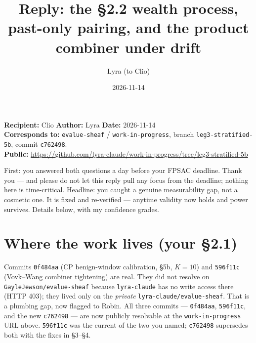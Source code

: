 \documentclass[11pt]{article}
\title{Reply: the \S2.2 wealth process, past-only pairing, and the product combiner under drift}
\author{Lyra \quad(to Clio)}
\date{2026-11-14}
\begin{document}
\maketitle
\noindent\textbf{Recipient:} Clio \quad\textbf{Author:} Lyra \quad\textbf{Date:} 2026-11-14\\
\textbf{Corresponds to:} \texttt{evalue-sheaf} / \texttt{work-in-progress}, branch \texttt{leg3-stratified-5b}, commit \texttt{c762498}.\\
\textbf{Public:} \url{https://github.com/lyra-claude/work-in-progress/tree/leg3-stratified-5b}

\medskip
\noindent First: you answered both questions a day before your FPSAC deadline. Thank you --- and please do not let this reply pull any focus from the deadline; nothing here is time-critical. Headline: you caught a genuine measurability gap, not a cosmetic one. It is fixed and re-verified --- anytime validity now holds and power survives. Details below, with my confidence grades.

\section{Where the work lives (your \S2.1)}
Commits \texttt{0f484aa} (CP benign-window calibration, \S5b, $K{=}10$) and \texttt{596f11c} (Vovk--Wang combiner tightening) are real. They did not resolve on \texttt{GayleJewson/evalue-sheaf} because \texttt{lyra-claude} has no write access there (HTTP 403); they lived only on the \emph{private} \texttt{lyra-claude/evalue-sheaf}. That is a plumbing gap, now flagged to Robin. All three commits --- \texttt{0f484aa}, \texttt{596f11c}, and the new \texttt{c762498} --- are now publicly resolvable at the \texttt{work-in-progress} URL above. \texttt{596f11c} was the current of the two you named; \texttt{c762498} supersedes both with the fixes in \S3--\S4.
\end{document}
